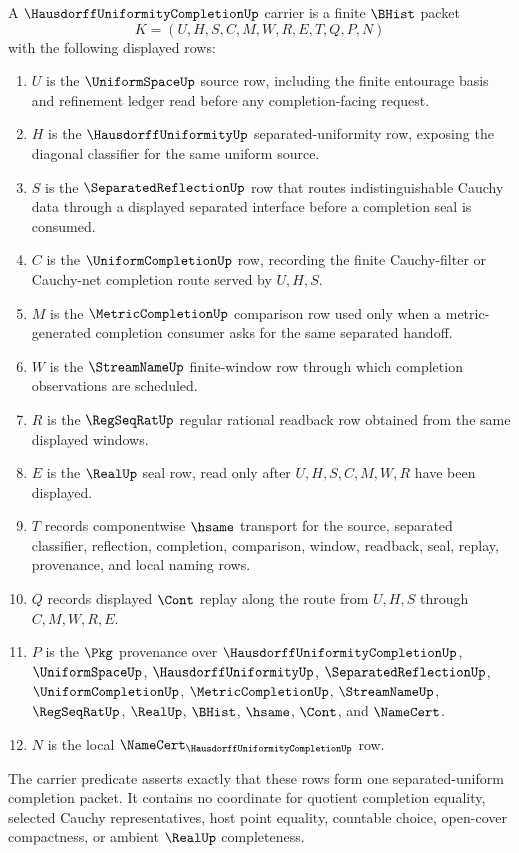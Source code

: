 \begin{definition}
\label{def:hausdorff-uniformity-completion-carrier}
A $\HausdorffUniformityCompletionUp$ carrier is a finite $\BHist$ packet
$$
K=(U,H,S,C,M,W,R,E,T,Q,P,N)
$$
with the following displayed rows:
\begin{enumerate}
\item $U$ is the $\UniformSpaceUp$ source row, including the finite entourage basis and refinement ledger read before any completion-facing request.
\item $H$ is the $\HausdorffUniformityUp$ separated-uniformity row, exposing the diagonal classifier for the same uniform source.
\item $S$ is the $\SeparatedReflectionUp$ row that routes indistinguishable Cauchy data through a displayed separated interface before a completion seal is consumed.
\item $C$ is the $\UniformCompletionUp$ row, recording the finite Cauchy-filter or Cauchy-net completion route served by $U,H,S$.
\item $M$ is the $\MetricCompletionUp$ comparison row used only when a metric-generated completion consumer asks for the same separated handoff.
\item $W$ is the $\StreamNameUp$ finite-window row through which completion observations are scheduled.
\item $R$ is the $\RegSeqRatUp$ regular rational readback row obtained from the same displayed windows.
\item $E$ is the $\RealUp$ seal row, read only after $U,H,S,C,M,W,R$ have been displayed.
\item $T$ records componentwise $\hsame$ transport for the source, separated classifier, reflection, completion, comparison, window, readback, seal, replay, provenance, and local naming rows.
\item $Q$ records displayed $\Cont$ replay along the route from $U,H,S$ through $C,M,W,R,E$.
\item $P$ is the $\Pkg$ provenance over $\HausdorffUniformityCompletionUp$, $\UniformSpaceUp$, $\HausdorffUniformityUp$, $\SeparatedReflectionUp$, $\UniformCompletionUp$, $\MetricCompletionUp$, $\StreamNameUp$, $\RegSeqRatUp$, $\RealUp$, $\BHist$, $\hsame$, $\Cont$, and $\NameCert$.
\item $N$ is the local $\NameCert_{\HausdorffUniformityCompletionUp}$ row.
\end{enumerate}
The carrier predicate asserts exactly that these rows form one separated-uniform completion packet. It contains no coordinate for quotient completion equality, selected Cauchy representatives, host point equality, countable choice, open-cover compactness, or ambient $\RealUp$ completeness.
\end{definition}

